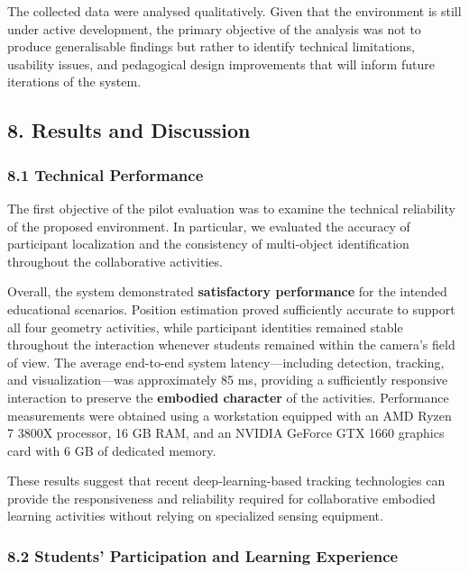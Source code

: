 The collected data were analysed qualitatively. Given that the
environment is still under active development, the primary objective of
the analysis was not to produce generalisable findings but rather to
identify technical limitations, usability issues, and pedagogical design
improvements that will inform future iterations of the system.

\subsection{8. Results and Discussion}\label{results-and-discussion}

\subsubsection{8.1 Technical Performance}\label{technical-performance}

The first objective of the pilot evaluation was to examine the technical
reliability of the proposed environment. In particular, we evaluated the
accuracy of participant localization and the consistency of multi-object
identification throughout the collaborative activities.

Overall, the system demonstrated \textbf{satisfactory performance} for
the intended educational scenarios. Position estimation proved
sufficiently accurate to support all four geometry activities, while
participant identities remained stable throughout the interaction
whenever students remained within the camera's field of view. The
average end-to-end system latency---including detection, tracking, and
visualization---was approximately 85 ms, providing a sufficiently
responsive interaction to preserve the \textbf{embodied character} of
the activities. Performance measurements were obtained using a
workstation equipped with an AMD Ryzen 7 3800X processor, 16 GB RAM, and
an NVIDIA GeForce GTX 1660 graphics card with 6 GB of dedicated memory.

These results suggest that recent deep-learning-based tracking
technologies can provide the responsiveness and reliability required for
collaborative embodied learning activities without relying on
specialized sensing equipment.

\subsubsection{8.2 Students' Participation and Learning
Experience}\label{students-participation-and-learning-experience}

